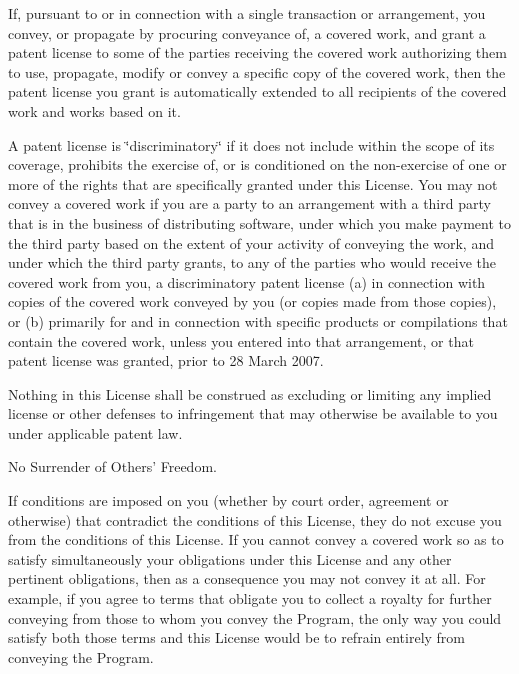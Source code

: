 If, pursuant to or in connection with a single transaction or arrangement, you convey, or propagate by procuring conveyance of, a covered work, and grant a patent license to some of the parties receiving the covered work authorizing them to use, propagate, modify or convey a specific copy of the covered work, then the patent license you grant is automatically extended to all recipients of the covered work and works based on it.

A patent license is \char`\"{}discriminatory\char`\"{} if it does not include within the scope of its coverage, prohibits the exercise of, or is conditioned on the non-\/exercise of one or more of the rights that are specifically granted under this License. You may not convey a covered work if you are a party to an arrangement with a third party that is in the business of distributing software, under which you make payment to the third party based on the extent of your activity of conveying the work, and under which the third party grants, to any of the parties who would receive the covered work from you, a discriminatory patent license (a) in connection with copies of the covered work conveyed by you (or copies made from those copies), or (b) primarily for and in connection with specific products or compilations that contain the covered work, unless you entered into that arrangement, or that patent license was granted, prior to 28 March 2007.

Nothing in this License shall be construed as excluding or limiting any implied license or other defenses to infringement that may otherwise be available to you under applicable patent law.


\begin{DoxyEnumerate}
\item No Surrender of Others' Freedom.
\end{DoxyEnumerate}

If conditions are imposed on you (whether by court order, agreement or otherwise) that contradict the conditions of this License, they do not excuse you from the conditions of this License. If you cannot convey a covered work so as to satisfy simultaneously your obligations under this License and any other pertinent obligations, then as a consequence you may not convey it at all. For example, if you agree to terms that obligate you to collect a royalty for further conveying from those to whom you convey the Program, the only way you could satisfy both those terms and this License would be to refrain entirely from conveying the Program.


